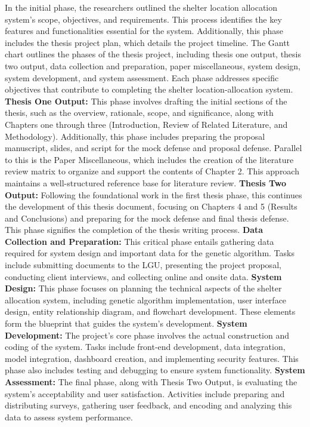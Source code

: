 In the initial phase, the researchers outlined the shelter location allocation system's scope, objectives, and requirements. This process identifies the key features and functionalities essential for the system. Additionally, this phase includes the thesis project plan, which details the project timeline.
The Gantt chart outlines the phases of the thesis project, including thesis one output, thesis two output, data collection and preparation, paper miscellaneous, system design, system development, and system assessment. Each phase addresses specific objectives that contribute to completing the shelter location-allocation system.
\textbf{Thesis One Output:} This phase involves drafting the initial sections of the thesis, such as the overview, rationale, scope, and significance, along with Chapters one through three (Introduction, Review of Related Literature, and Methodology). Additionally, this phase includes preparing the proposal manuscript, slides, and script for the mock defense and proposal defense. Parallel to this is the Paper Miscellaneous, which includes the creation of the literature review matrix to organize and support the contents of Chapter 2. This approach maintains a well-structured reference base for literature review.
\textbf{Thesis Two Output:} Following the foundational work in the first thesis phase, this continues the development of this thesis document, focusing on Chapters 4 and 5 (Results and Conclusions) and preparing for the mock defense and final thesis defense. This phase signifies the completion of the thesis writing process.
\textbf{Data Collection and Preparation:} This critical phase entails gathering data required for system design and important data for the genetic algorithm. Tasks include submitting documents to the LGU, presenting the project proposal, conducting client interviews, and collecting online and onsite data.
\textbf{System Design:} This phase focuses on planning the technical aspects of the shelter allocation system, including genetic algorithm implementation, user interface design, entity relationship diagram, and flowchart development. These elements form the blueprint that guides the system's development.
\textbf{System Development:} The project's core phase involves the actual construction and coding of the system. Tasks include front-end development, data integration, model integration, dashboard creation, and implementing security features. This phase also includes testing and debugging to ensure system functionality.
\textbf{System Assessment:} The final phase, along with Thesis Two Output, is evaluating the system's acceptability and user satisfaction. Activities include preparing and distributing surveys, gathering user feedback, and encoding and analyzing this data to assess system performance.

